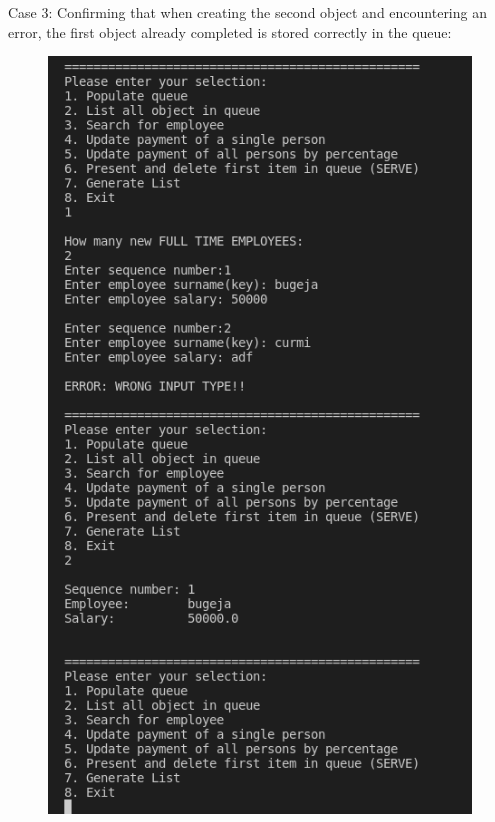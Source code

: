 \documentclass[12pt]{article}
\begin{document}
Case 3: Confirming that when creating the second object and encountering an error, the first object already completed is stored correctly in the queue:
\begin{figure}[h]
\centering
\includegraphics[scale=0.30]{Images/Testing 2/2.png}
\end{figure}
\newpage
\end{document}
